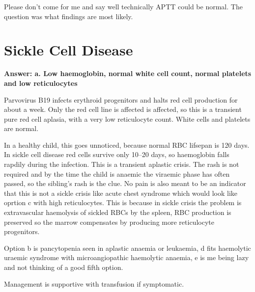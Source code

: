 \documentclass{article}
\begin{document}
Please don't come for me and say well technically APTT could be normal. The question was what findings are most likely. 

\section{Sickle Cell Disease}

\textbf{Answer: a. Low haemoglobin, normal white cell count, normal platelets and low reticulocytes}

Parvovirus B19 infects erythroid progenitors and halts red cell production for about a week. Only the red cell line is affected is affected, so this is a transient pure red cell aplasia, with a very low reticulocyte count. White cells and platelets are normal. 

In a healthy child, this goes unnoticed, because normal RBC lifsepan is 120 days. In sickle cell disease red cells survive only 10--20 days, so haemoglobin falls rapdily during the infection. This is a transient aplastic crisis. The rash is not required and by the time the child is anaemic the viraemic phase has often passed, so the sibling's rash is the clue. No pain is also meant to be an indicator that this is not a sickle crisis like acute chest syndrome which would look like oprtion c with high reticulocytes. This is because in sickle crisis the problem is extravascular haemolysis of sickled RBCs by the spleen, RBC production is preserved so the marrow compensates by producing more reticulocyte progenitors. 

Option b is pancytopenia seen in aplastic anaemia or leukaemia, d fits haemolytic uraemic syndrome with microangiopathic haemolytic anaemia, e is me being lazy and not thinking of a good fifth option. 

Management is supportive with transfusion if symptomatic. 
\end{document}
